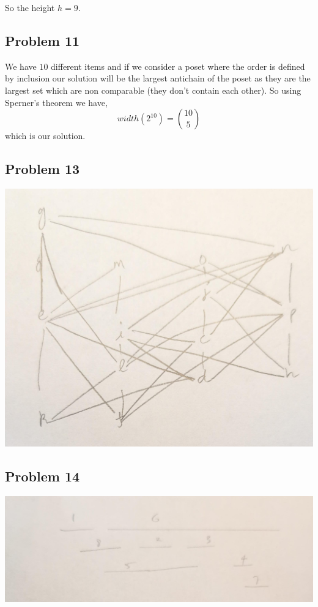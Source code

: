 \documentclass[a4paper]{report}
\begin{document}
So the height $h = 9$.
\subsection*{Problem 11}

We have $10$ different items and if we consider a poset where the order is defined by  inclusion our solution will be the largest antichain of the poset as they are the largest set which  are non comparable (they don't contain each other). So using Sperner's theorem we have, 
$$ width(2^{10}) = {10 \choose 5} $$ 
which is our solution.
\subsection*{Problem 13}
\includegraphics[scale=.2]{13}

\subsection*{Problem 14}

\includegraphics[scale=.20]{14}
\end{document}
